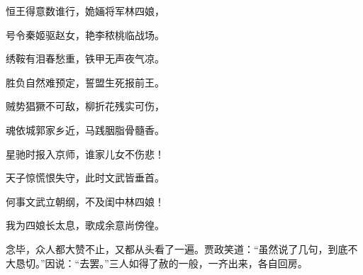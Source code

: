 \begin{poem}
    \begin{pl}
        恒王得意数谁行，姽婳将军林四娘，
    \end{pl}
    \begin{pl}
        号令秦姬驱赵女，艳李秾桃临战场。
    \end{pl}
    \begin{pl}
        绣鞍有泪春愁重，铁甲无声夜气凉。
    \end{pl}
    \begin{pl}
        胜负自然难预定，誓盟生死报前王。
    \end{pl}
    \begin{pl}
        贼势猖獗不可敌，柳折花残实可伤，
    \end{pl}
    \begin{pl}
        魂依城郭家乡近，马践胭脂骨髓香。
    \end{pl}
    \begin{pl}
        星驰时报入京师，谁家儿女不伤悲！
    \end{pl}
    \begin{pl}
        天子惊慌恨失守，此时文武皆垂首。
    \end{pl}
    \begin{pl}
        何事文武立朝纲，不及闺中林四娘！
    \end{pl}
    \begin{pl}
        我为四娘长太息，歌成余意尚傍徨。
    \end{pl}
\end{poem}


\begin{parag}
    念毕，众人都大赞不止，又都从头看了一遍。贾政笑道：“虽然说了几句，到底不大恳切。”因说：“去罢。”三人如得了赦的一般，一齐出来，各自回房。
\end{parag}


